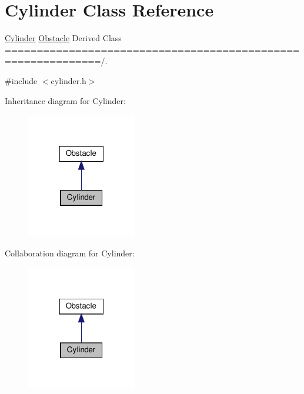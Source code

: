 \hypertarget{class_cylinder}{}\section{Cylinder Class Reference}
\label{class_cylinder}


\hyperlink{class_cylinder}{Cylinder} \hyperlink{class_obstacle}{Obstacle} Derived Class =============================================================/.  




{\ttfamily \#include $<$cylinder.\+h$>$}



Inheritance diagram for Cylinder\+:
\nopagebreak
\begin{figure}[H]
\begin{center}
\leavevmode
\includegraphics[width=136pt]{class_cylinder__inherit__graph}
\end{center}
\end{figure}


Collaboration diagram for Cylinder\+:
\nopagebreak
\begin{figure}[H]
\begin{center}
\leavevmode
\includegraphics[width=136pt]{class_cylinder__coll__graph}
\end{center}
\end{figure}
